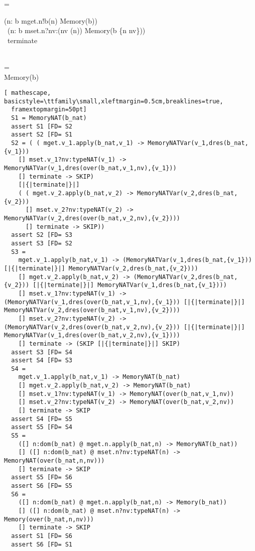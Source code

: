 \documentclass{llncs}
\begin{document}
\begin{argue}
=\\
\begin{block}
(\Extchoice n: \dom b \circspot mget.n!b(n) \then Memory(b))\\
\extchoice~(\Extchoice n: \dom b \circspot mset.n?nv:(nv \in \delta(n)) \then Memory(b \oplus \{n \mapsto nv\}))\\
 \extchoice~terminate \then \Skip
 \end{block}\\

= \\

Memory(b)
\end{argue}
\pagebreak
\begin{lstlisting}[ mathescape, basicstyle=\ttfamily\small,xleftmargin=0.5cm,breaklines=true,
  framextopmargin=50pt]
  S1 = MemoryNAT(b_nat)
  assert S1 [FD= S2
  assert S2 [FD= S1
  S2 = ( ( mget.v_1.apply(b_nat,v_1) -> MemoryNATVar(v_1,dres(b_nat,{v_1}))
    [] mset.v_1?nv:typeNAT(v_1) -> MemoryNATVar(v_1,dres(over(b_nat,v_1,nv),{v_1}))
    [] terminate -> SKIP)
    [|{|terminate|}|]
    ( ( mget.v_2.apply(b_nat,v_2) -> MemoryNATVar(v_2,dres(b_nat,{v_2}))
      [] mset.v_2?nv:typeNAT(v_2) -> MemoryNATVar(v_2,dres(over(b_nat,v_2,nv),{v_2})))
      [] terminate -> SKIP))
  assert S2 [FD= S3
  assert S3 [FD= S2
  S3 =
    mget.v_1.apply(b_nat,v_1) -> (MemoryNATVar(v_1,dres(b_nat,{v_1})) [|{|terminate|}|] MemoryNATVar(v_2,dres(b_nat,{v_2})))
    [] mget.v_2.apply(b_nat,v_2) -> (MemoryNATVar(v_2,dres(b_nat,{v_2})) [|{|terminate|}|] MemoryNATVar(v_1,dres(b_nat,{v_1})))
    [] mset.v_1?nv:typeNAT(v_1) -> (MemoryNATVar(v_1,dres(over(b_nat,v_1,nv),{v_1})) [|{|terminate|}|] MemoryNATVar(v_2,dres(over(b_nat,v_1,nv),{v_2})))
    [] mset.v_2?nv:typeNAT(v_2) -> (MemoryNATVar(v_2,dres(over(b_nat,v_2,nv),{v_2})) [|{|terminate|}|] MemoryNATVar(v_1,dres(over(b_nat,v_2,nv),{v_1})))
    [] terminate -> (SKIP [|{|terminate|}|] SKIP)
  assert S3 [FD= S4
  assert S4 [FD= S3
  S4 =
    mget.v_1.apply(b_nat,v_1) -> MemoryNAT(b_nat)
    [] mget.v_2.apply(b_nat,v_2) -> MemoryNAT(b_nat)
    [] mset.v_1?nv:typeNAT(v_1) -> MemoryNAT(over(b_nat,v_1,nv))
    [] mset.v_2?nv:typeNAT(v_2) -> MemoryNAT(over(b_nat,v_2,nv))
    [] terminate -> SKIP
  assert S4 [FD= S5
  assert S5 [FD= S4
  S5 =
    ([] n:dom(b_nat) @ mget.n.apply(b_nat,n) -> MemoryNAT(b_nat))
    [] ([] n:dom(b_nat) @ mset.n?nv:typeNAT(n) -> MemoryNAT(over(b_nat,n,nv)))
    [] terminate -> SKIP
  assert S5 [FD= S6
  assert S6 [FD= S5
  S6 =
    ([] n:dom(b_nat) @ mget.n.apply(b_nat,n) -> Memory(b_nat))
    [] ([] n:dom(b_nat) @ mset.n?nv:typeNAT(n) -> Memory(over(b_nat,n,nv)))
    [] terminate -> SKIP
  assert S1 [FD= S6
  assert S6 [FD= S1

\end{lstlisting}
\end{document}

